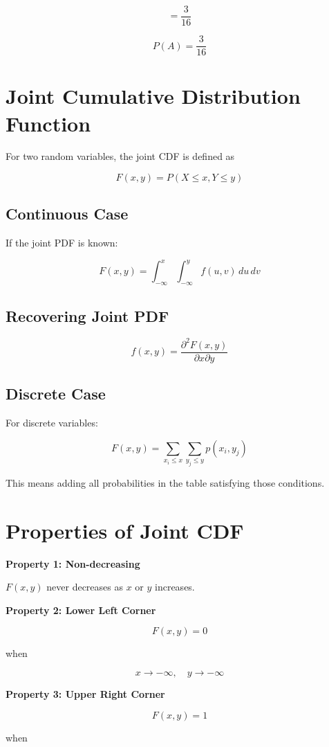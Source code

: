 \documentclass[12pt,a4paper]{article}
\begin{document}
\[
=\frac{3}{16}
\]

\[
P(A)=\frac{3}{16}
\]

\section{Joint Cumulative Distribution Function}

For two random variables, the joint CDF is defined as

\[
F(x,y)=P(X\le x,Y\le y)
\]

\subsection{Continuous Case}

If the joint PDF is known:

\[
F(x,y)=\int_{-\infty}^{x}\int_{-\infty}^{y}f(u,v)\,du\,dv
\]

\subsection{Recovering Joint PDF}

\[
f(x,y)=\frac{\partial^2 F(x,y)}{\partial x \partial y}
\]

\subsection{Discrete Case}

For discrete variables:

\[
F(x,y)=\sum_{x_i\le x}\sum_{y_j\le y}p(x_i,y_j)
\]

This means adding all probabilities in the table satisfying those conditions.

\section{Properties of Joint CDF}

\textbf{Property 1: Non-decreasing}

$F(x,y)$ never decreases as $x$ or $y$ increases.

\textbf{Property 2: Lower Left Corner}

\[
F(x,y)=0
\]

when

\[
x\to -\infty, \quad y\to -\infty
\]

\textbf{Property 3: Upper Right Corner}

\[
F(x,y)=1
\]

when
\end{document}
